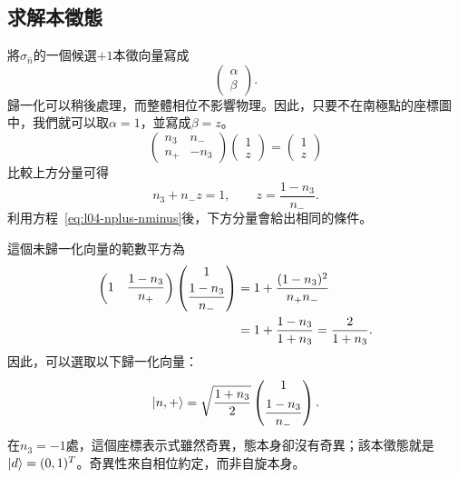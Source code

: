 \subsection{求解本徵態}

將\(\sigma_{\hat n}\)的一個候選\(+1\)本徵向量寫成
\begin{equation}
  \begin{pmatrix}\alpha\\\beta\end{pmatrix}.
\end{equation}
歸一化可以稍後處理，而整體相位不影響物理。因此，只要不在南極點的座標圖中，我們就可以取\(\alpha=1\)，並寫成\(\beta=z\)。
\begin{equation}
  \begin{pmatrix}
    n_3&n_-\\
    n_+&-n_3
  \end{pmatrix}
  \begin{pmatrix}1\\z\end{pmatrix}
  =
  \begin{pmatrix}1\\z\end{pmatrix}
\end{equation}
比較上方分量可得
\begin{equation}
  n_3+n_-z=1,
  \qquad
  z=\frac{1-n_3}{n_-}.
  \label{eq:l04-z-solution}
\end{equation}
利用方程~\eqref{eq:l04-nplus-nminus}後，下方分量會給出相同的條件。

這個未歸一化向量的範數平方為
\begin{align}
  \begin{pmatrix}
    1&\dfrac{1-n_3}{n_+}
  \end{pmatrix}
  \begin{pmatrix}
    1\\[3pt]\dfrac{1-n_3}{n_-}
  \end{pmatrix}
  &=
  1+\frac{(1-n_3)^2}{n_+n_-}
  \notag\\
  &=
  1+\frac{1-n_3}{1+n_3}
  =
  \frac{2}{1+n_3}.
  \label{eq:l04-unnormalized-norm}
\end{align}
因此，可以選取以下歸一化向量：
\begin{equation}
  \left\lvert n,+\right\rangle
  =
  \sqrt{\frac{1+n_3}{2}}
  \begin{pmatrix}
    1\\[5pt]\dfrac{1-n_3}{n_-}
  \end{pmatrix}.
  \label{eq:l04-normalized-n-state}
\end{equation}
在\(n_3=-1\)處，這個座標表示式雖然奇異，態本身卻沒有奇異；該本徵態就是\(\left\lvert d\right\rangle=(0,1)^T\)。奇異性來自相位約定，而非自旋本身。

